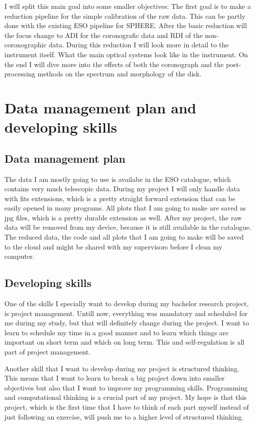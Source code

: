 \documentclass[twoside,single]{lion-msc}
\begin{document}
I will split this main goal into some smaller objectives: The first goal is to make a reduction pipeline for the simple calibration of the raw data. This can be partly done with the existing ESO pipeline for SPHERE. After the basic reduction will the focus change to ADI for the coronografic data and RDI of the non-coronographic data. During this reduction I will look more in detail to the instrument itself. What the main optical systems look like in the instrument. On the end I will dive more into the effects of both the coronograph and the post-processing methods on the spectrum and morphology of the disk.

\chapter{Data management plan and developing skills}
\section{Data management plan}
The data I am mostly going to use is availabe in the ESO catalogue, which contains very much telescopic data. During my project I will only handle data with fits extensions, which is a pretty straight forward extension that can be easily opened in many programs. All plots that I am going to make are saved as jpg files, which is a pretty durable extension as well. After my project, the raw data will be removed from my device, because it is still available in the catalogue. The reduced data, the code and all plots that I am going to make will be saved to the cloud and might be shared with my supervisors before I clean my computer.


\section{Developing skills}
One of the skills I specially want to develop during my bachelor research project, is project management. Untill now, everything was mandatory and scheduled for me during my study, but that will definitely change during the project. I want to learn to schedule my time in a good manner and to learn which things are important on short term and which on long term. This and self-regulation is all part of project management.
\bigskip

Another skill that I want to develop during my project is structured thinking. This means that I want to learn to break a big project down into smaller objectives but also that I want to improve my programming skills. Programming and computational thinking is a crucial part of my project. My hope is that this project, which is the first time that I have to think of each part myself instead of just following an exercise, will push me to a higher level of structured thinking.
\bigskip
\end{document}
